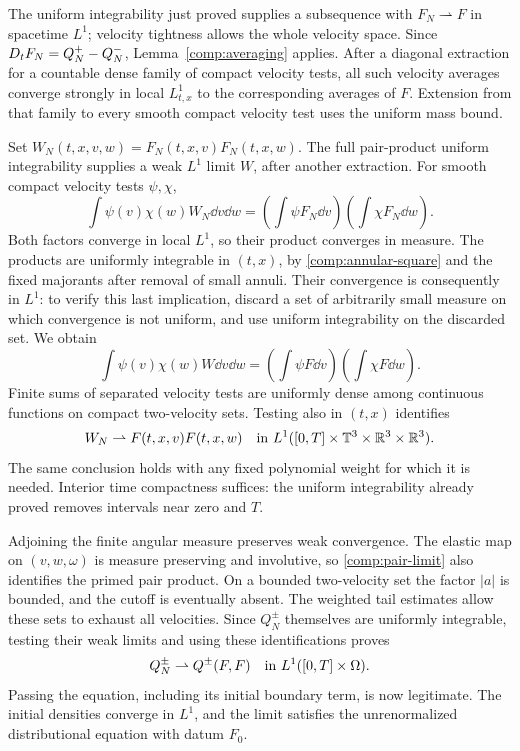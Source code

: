 The uniform integrability just proved supplies a subsequence with
\(F_N\rightharpoonup F\) in spacetime \(L^1\); velocity tightness
allows the whole velocity space. Since
\(D_t F_N=Q_N^+-Q_N^-\), Lemma~\ref{comp:averaging} applies.
After a diagonal extraction for a countable dense family of compact
velocity tests, all such velocity averages converge strongly in local
\(L^1_{t,x}\) to the corresponding averages of \(F\). Extension from
that family to every smooth compact velocity test uses the uniform
mass bound.

Set \(W_N(t,x,v,w)=F_N(t,x,v)F_N(t,x,w)\). The full pair-product
uniform integrability supplies a weak \(L^1\) limit \(W\), after
another extraction. For smooth compact velocity tests \(\psi,\chi\),
\[
\int\psi(v)\chi(w)W_N\dd v\dd w
=\left(\int\psi F_N\dd v\right)
 \left(\int\chi F_N\dd w\right).
\]
Both factors converge in local \(L^1\), so their product converges in
measure. The products are uniformly integrable in \((t,x)\), by
\eqref{comp:annular-square} and the fixed majorants after removal of
small annuli. Their convergence is consequently in \(L^1\): to verify
this last implication, discard a set of arbitrarily small measure on
which convergence is not uniform, and use uniform integrability on the
discarded set. We obtain
\[
\int\psi(v)\chi(w)W\dd v\dd w
=\left(\int\psi F\dd v\right)
 \left(\int\chi F\dd w\right).
\]
Finite sums of separated velocity tests are uniformly dense among
continuous functions on compact two-velocity sets. Testing also in
\((t,x)\) identifies
\begin{equation}\label{comp:pair-limit}
W_N\rightharpoonup F(t,x,v)F(t,x,w)
\quad\hbox{in }L^1([0,T]\times\mathbb T^3\times\mathbb R^3\times\mathbb R^3).
\end{equation}
The same conclusion holds with any fixed polynomial weight for which
it is needed. Interior time compactness suffices: the uniform
integrability already proved removes intervals near zero and \(T\).

Adjoining the finite angular measure preserves weak convergence. The
elastic map on \((v,w,\omega)\) is measure preserving and involutive,
so \eqref{comp:pair-limit} also identifies the primed pair product.
On a bounded two-velocity set the factor \(|a|\) is bounded, and the
cutoff is eventually absent. The weighted tail estimates allow these
sets to exhaust all velocities. Since \(Q_N^\pm\) themselves are
uniformly integrable, testing their weak limits and using these
identifications proves
\begin{equation}\label{comp:collision-limit}
Q_N^\pm\rightharpoonup Q^\pm(F,F)
\quad\hbox{in }L^1([0,T]\times\Omega).
\end{equation}
Passing the equation, including its initial boundary term, is now
legitimate. The initial densities converge in \(L^1\), and the limit
satisfies the unrenormalized distributional equation with datum \(F_0\).

